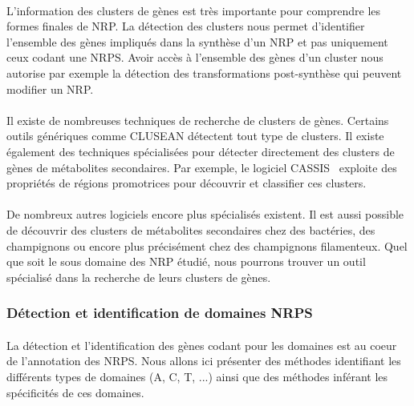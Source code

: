 \documentclass[12pt,french,twoside]{report}
\begin{document}
\paragraph{}L'information des clusters de gènes est très importante pour comprendre les formes finales de NRP.
La détection des clusters nous permet d'identifier l'ensemble des gènes impliqués dans la synthèse d'un NRP et pas uniquement ceux codant une NRPS.
Avoir accès à l'ensemble des gènes d'un cluster nous autorise par exemple la détection des transformations post-synthèse qui peuvent modifier un NRP.

\paragraph{}Il existe de nombreuses techniques de recherche de clusters de gènes.
Certains outils génériques comme CLUSEAN\cite{weber_clusean:_2009} détectent tout type de clusters.
Il existe également des techniques spécialisées pour détecter directement des clusters de gènes de métabolites secondaires.
Par exemple, le logiciel CASSIS~\cite{wolf_cassis_2016} exploite des propriétés de régions promotrices pour découvrir et classifier ces clusters.

\paragraph{}De nombreux autres logiciels encore plus spécialisés existent.
Il est aussi possible de découvrir des clusters de métabolites secondaires chez des bactéries\cite{cruz-morales_recapitulation_2015}, des champignons\cite{khaldi_smurf:_2010} ou encore plus précisément chez des champignons filamenteux\cite{andersen_accurate_2013,umemura_motif-independent_2015}.
Quel que soit le sous domaine des NRP étudié, nous pourrons trouver un outil spécialisé dans la recherche de leurs clusters de gènes.


\subsubsection{Détection et identification de domaines NRPS}

\paragraph{}La détection et l'identification des gènes codant pour les domaines est au coeur de l'annotation des NRPS.
Nous allons ici présenter des méthodes identifiant les différents types de domaines (A, C, T, ...) ainsi que des méthodes inférant les spécificités de ces domaines.
\end{document}
